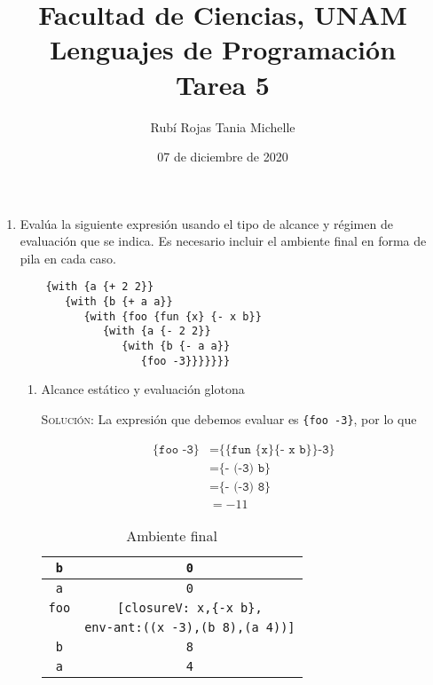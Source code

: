 \documentclass[letterpaper,11pt]{article}
\title{Facultad de Ciencias, UNAM \\ 
       Lenguajes de Programación\\ 
       Tarea 5}
\author{Rubí Rojas Tania Michelle}
\date{07 de diciembre de 2020}
\begin{document}
\maketitle

\begin{enumerate}
    \item Evalúa la siguiente expresión usando el tipo de alcance y régimen de 
    evaluación que se indica. Es necesario incluir el ambiente final en forma 
    de pila en cada caso. 
    \begin{verbatim}
    {with {a {+ 2 2}}
       {with {b {+ a a}}
          {with {foo {fun {x} {- x b}}
             {with {a {- 2 2}}
                {with {b {- a a}}
                   {foo -3}}}}}}}
    \end{verbatim}

    \begin{enumerate}
        \item Alcance estático y evaluación glotona

        \textsc{Solución:} La expresión que debemos evaluar es 
        \texttt{\{foo -3\}}, por lo que 
        \begin{table}[h]
            \parbox{.55\linewidth}{
            \centering
            \begin{align*}
                \texttt{\{foo -3\}} 
                &= \texttt{\{\{fun \{x\} \{- x b\}\} -3\}} \\
                &= \texttt{\{- (-3) b\}} \\
                &= \texttt{\{- (-3) 8\}} \\
                &= -11
            \end{align*}
            }
            \hfill
            \parbox{.45\linewidth}{
            \centering
            \begin{tabular}{|c|c|}
            \hline
            \texttt{b} & \texttt{0} \\
            \hline
            \texttt{a} & \texttt{0} \\
            \hline
            \texttt{foo} & \texttt{[closureV: x,\{-x b\},} \\
             & \texttt{env-ant:((x -3),(b 8),(a 4))]} \\
            \hline
            \texttt{b} & \texttt{8} \\
            \hline
            \texttt{a} & \texttt{4} \\
            \hline
            \end{tabular}
            \caption{Ambiente final}
            }
        \end{table}


\end{enumerate}
\end{enumerate}
\end{document}
